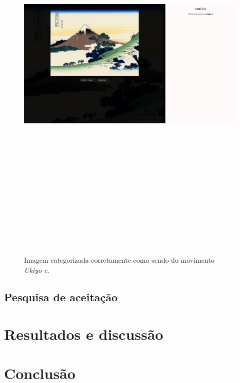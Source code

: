 \documentclass[12pt, a4paper]{article}
\begin{document}
\begin{figure}[H]
	\centering
	\includegraphics[width=\textwidth, height=20cm, keepaspectratio=true]{fig/site_imgcategorized}
	\caption{Imagem categorizada corretamente como sendo do movimento \emph{Ukiyo-e}.}
\end{figure}

\subsection{Pesquisa de aceitação}

\section{Resultados e discussão}
\section{Conclusão}

\newpage
\printbibliography
\end{document}
